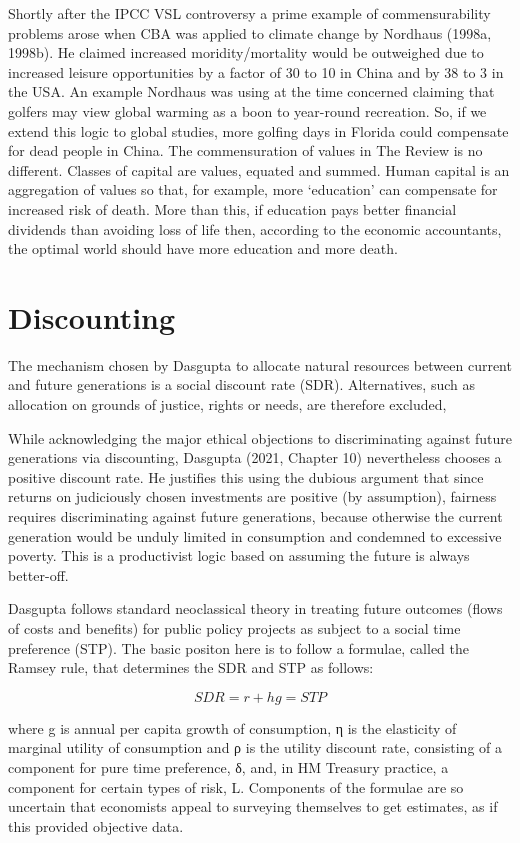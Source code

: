 \documentclass[
]{book}
\begin{document}
Shortly after the IPCC VSL controversy a prime example of commensurability problems arose
when CBA was applied to climate change by Nordhaus (1998a, 1998b). He claimed increased
moridity/mortality would be outweighed due to increased leisure opportunities by a factor of 30 to 10
in China and by 38 to 3 in the USA. An example Nordhaus was using at the time concerned claiming
that golfers may view global warming as a boon to year-round recreation. So, if we extend this
logic to global studies, more golfing days in Florida could compensate for dead people in China.
The commensuration of values in The Review is no different. Classes of capital are values,
equated and summed. Human capital is an aggregation of values so that, for example, more `education'
can compensate for increased risk of death. More than this, if education pays better financial
dividends than avoiding loss of life then, according to the economic accountants, the optimal world
should have more education and more death.

\hypertarget{discounting-1}{%
\section{Discounting}\label{discounting-1}}

The mechanism chosen by Dasgupta to allocate natural resources between current and future
generations is a social discount rate (SDR). Alternatives, such as allocation on grounds of justice, rights
or needs, are therefore excluded,

While acknowledging the major ethical objections to discriminating against future
generations via discounting, Dasgupta (2021, Chapter 10) nevertheless chooses a positive discount
rate. He justifies this using the dubious argument that since returns on judiciously chosen
investments are positive (by assumption), fairness requires discriminating against future generations,
because otherwise the current generation would be unduly limited in consumption and condemned
to excessive poverty. This is a productivist logic based on assuming the future is always better-off.

Dasgupta follows standard neoclassical theory in treating future outcomes (flows of costs
and benefits) for public policy projects as subject to a social time preference (STP). The basic positon
here is to follow a formulae, called the Ramsey rule, that determines the SDR and STP as follows:

\[SDR = r + h g = STP\]

where g is annual per capita growth of consumption, η is the elasticity of marginal utility of
consumption and ρ is the utility discount rate, consisting of a component for pure time preference, δ, and, in
HM Treasury practice, a component for certain types of risk, L. Components of the formulae are so
uncertain that economists appeal to surveying themselves to get estimates, as if
this provided objective data.
\end{document}
